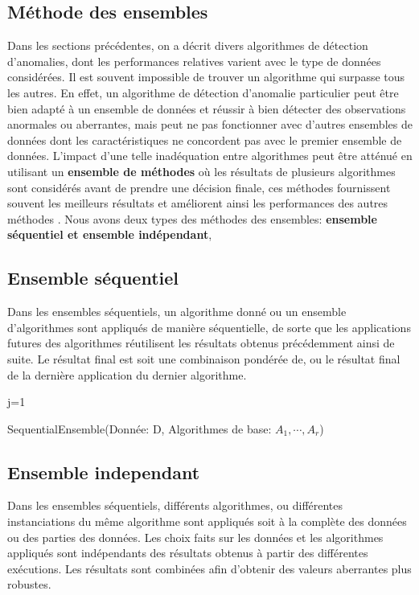 \subsection{Méthode des ensembles}
%
%
Dans les sections précédentes, on a décrit divers algorithmes de détection d’anomalies, dont les performances relatives varient avec le type de données considérées. Il est souvent  impossible de trouver un algorithme qui surpasse tous les autres. En effet, un algorithme de détection d'anomalie particulier peut être bien adapté à un ensemble de données et réussir à bien détecter des observations anormales ou aberrantes, mais peut ne pas fonctionner avec d’autres ensembles de données dont les caractéristiques ne concordent pas avec le premier ensemble de données. L'impact d'une telle inadéquation  entre algorithmes peut être atténué en utilisant un \textbf{ ensemble  de méthodes} où les résultats de plusieurs algorithmes sont considérés avant de prendre une décision finale, ces méthodes fournissent souvent les meilleurs résultats et améliorent ainsi les performances des autres méthodes \cite{A10}. Nous avons deux types des méthodes des ensembles: \textbf{ensemble séquentiel et ensemble indépendant}, \newl
\subsection*{Ensemble séquentiel }
Dans les ensembles séquentiels, un algorithme donné ou un ensemble d'algorithmes sont
appliqués de manière séquentielle, de sorte que les applications futures des algorithmes
réutilisent les résultats obtenus précédemment ainsi de suite. Le résultat final est soit une combinaison pondérée de, ou le résultat final de la dernière application du dernier algorithme. 

\begin{algorithm}[H]
\SetAlgoLined
j=1\;
\caption{SequentialEnsemble(Donnée: D,
	Algorithmes de base: $A_1,\cdots,A_r$)}
\end{algorithm}%
\subsection*{Ensemble independant}
Dans les ensembles séquentiels, différents algorithmes, ou différentes instanciations
du même algorithme sont appliqués soit à la complète
des données ou des parties des données. Les choix faits sur les données
et les algorithmes appliqués sont indépendants des résultats obtenus
à partir des différentes exécutions. Les résultats sont combinées afin d'obtenir des valeurs aberrantes plus robustes.

